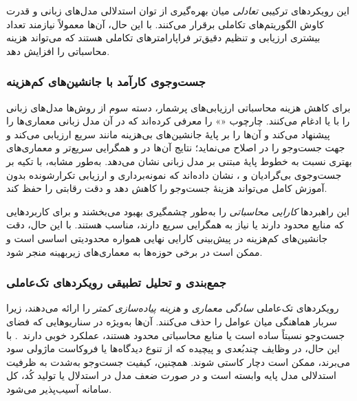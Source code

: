 این رویکردهای ترکیبی \emph{تعادلی} میان بهره‌گیری از توان استدلالی مدل‌های زبانی و قدرت کاوش الگوریتم‌های تکاملی برقرار می‌کنند. با این حال، آن‌ها معمولاً نیازمند تعداد بیشتری ارزیابی و تنظیم دقیق‌تر فراپارامترهای تکاملی هستند که می‌تواند هزینه محاسباتی را افزایش دهد.

\subsubsection{جست‌وجوی کارآمد با جانشین‌های کم‌هزینه}
برای کاهش هزینه محاسباتی ارزیابی‌های پرشمار، دسته سوم از روش‌ها مدل‌های زبانی را با  یا  ادغام می‌کنند. \cite{ji2025RZNAS} چارچوب «» را معرفی کرده‌اند که در آن مدل زبانی معماری‌ها را پیشنهاد می‌کند و آن‌ها را بر پایهٔ جانشین‌های بی‌هزینه مانند  سریع ارزیابی می‌کند و جهت جست‌وجو را در  اصلاح می‌نماید؛ نتایج آن‌ها در  و  همگرایی سریع‌تر و معماری‌های بهتری نسبت به خطوط پایهٔ مبتنی بر مدل زبانی نشان می‌دهد. به‌طور مشابه، \cite{sarah2024llamaNAS} با تکیه بر جست‌وجوی بی‌گرادیان و ، نشان داده‌اند که نمونه‌برداری و ارزیابی تکرارشونده بدون آموزش کامل می‌تواند هزینهٔ جست‌وجو را کاهش دهد و دقت رقابتی را حفظ کند.

این راهبردها \emph{کارایی محاسباتی} را به‌طور چشمگیری بهبود می‌بخشند و برای کاربردهایی که منابع محدود دارند یا نیاز به همگرایی سریع دارند، مناسب هستند. با این حال، دقت جانشین‌های کم‌هزینه در پیش‌بینی کارایی نهایی همواره محدودیتی اساسی است و ممکن است در برخی حوزه‌ها به معماری‌های زیربهینه منجر شود.

\subsubsection{جمع‌بندی و تحلیل تطبیقی رویکردهای تک‌عاملی}
رویکردهای تک‌عاملی \emph{سادگی معماری} و \emph{هزینه پیاده‌سازی کمتر} را ارائه می‌دهند، زیرا سربار هماهنگی میان عوامل را حذف می‌کنند. آن‌ها به‌ویژه در سناریوهایی که فضای جست‌وجو نسبتاً ساده است یا منابع محاسباتی محدود هستند، عملکرد خوبی دارند~\cite{zhang2023usingLLMforHPO,zheng2023GENIUS,ji2025RZNAS}. با این حال، در وظایف چندبُعدی و پیچیده که از تنوع دیدگاه‌ها یا فروکاست ماژولی سود می‌برند، ممکن است دچار کاستی شوند. همچنین، کیفیت جست‌وجو به‌شدت به ظرفیت استدلالی مدل پایه وابسته است و در صورت ضعف مدل در استدلال یا تولید کُد، کل سامانه آسیب‌پذیر می‌شود.

